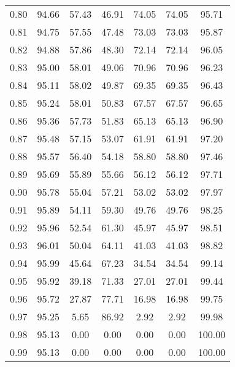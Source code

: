 \begin{tabular}{|c|c|c|c|c|c|c|}
      0.80 &     94.66 &     57.43 &      46.91 &   74.05 &      74.05 &         95.71 \\
      0.81 &     94.75 &     57.55 &      47.48 &   73.03 &      73.03 &         95.87 \\
      0.82 &     94.88 &     57.86 &      48.30 &   72.14 &      72.14 &         96.05 \\
      0.83 &     95.00 &     58.01 &      49.06 &   70.96 &      70.96 &         96.23 \\
      0.84 &     95.11 &     58.02 &      49.87 &   69.35 &      69.35 &         96.43 \\
      0.85 &     95.24 &     58.01 &      50.83 &   67.57 &      67.57 &         96.65 \\
      0.86 &     95.36 &     57.73 &      51.83 &   65.13 &      65.13 &         96.90 \\
      0.87 &     95.48 &     57.15 &      53.07 &   61.91 &      61.91 &         97.20 \\
      0.88 &     95.57 &     56.40 &      54.18 &   58.80 &      58.80 &         97.46 \\
      0.89 &     95.69 &     55.89 &      55.66 &   56.12 &      56.12 &         97.71 \\
      0.90 &     95.78 &     55.04 &      57.21 &   53.02 &      53.02 &         97.97 \\
      0.91 &     95.89 &     54.11 &      59.30 &   49.76 &      49.76 &         98.25 \\
      0.92 &     95.96 &     52.54 &      61.30 &   45.97 &      45.97 &         98.51 \\
      0.93 &     96.01 &     50.04 &      64.11 &   41.03 &      41.03 &         98.82 \\
      0.94 &     95.99 &     45.64 &      67.23 &   34.54 &      34.54 &         99.14 \\
      0.95 &     95.92 &     39.18 &      71.33 &   27.01 &      27.01 &         99.44 \\
      0.96 &     95.72 &     27.87 &      77.71 &   16.98 &      16.98 &         99.75 \\
      0.97 &     95.25 &      5.65 &      86.92 &    2.92 &       2.92 &         99.98 \\
      0.98 &     95.13 &      0.00 &       0.00 &    0.00 &       0.00 &        100.00 \\
      0.99 &     95.13 &      0.00 &       0.00 &    0.00 &       0.00 &        100.00 \\
\bottomrule
\end{tabular}

